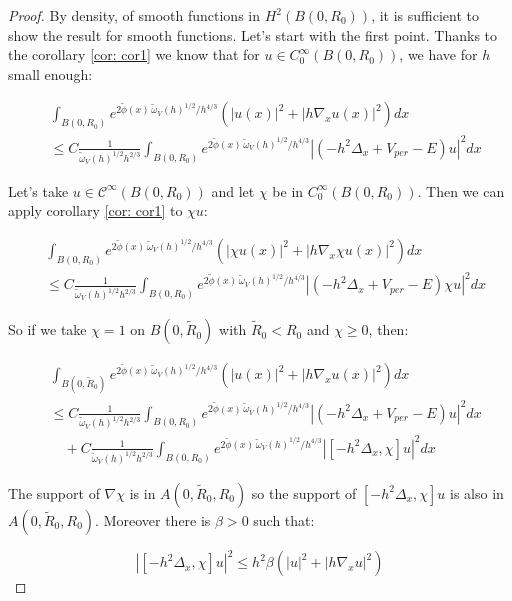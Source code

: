 \documentclass[10pt,a4paper]{amsart}
\newcommand{\nn}{\nonumber}
\begin{document}
\begin{proof}
	By density, of smooth functions in $H^2(B(0,R_0))$, it is sufficient to show the result for smooth functions. 
Let's start with the first point. Thanks to the corollary \ref{cor: cor1} we know that for $u \in C_0^\infty(B(0,R_0))$, we have for $h$ small enough:

\begin{align}
    &\int_{B(0,R_0)} e^{2\tilde{\phi}(x)\,\tilde{\omega}_V(h)^{1/2}/ h^{4/3}} (|u(x)|^2 +|h\nabla_x u(x)|^2)dx\nn\\
    &\leq C \frac{1}{\tilde{\omega}_V(h)^{1/2}h^{2/3}}\int_{B(0,R_0)} e^{2\tilde{\phi}(x)\,\tilde{\omega}_V(h)^{1/2}/ h^{4/3}}|(-h^2\Delta_x + V_{per}- E)u|^2dx
\end{align}

Let's take $u\in \mathcal{C}^\infty(B(0,R_0))$  and let $\chi$ be in $ C_0^\infty(B(0,R_0))$. Then we can apply corollary \ref{cor: cor1} to $\chi u$:

\begin{align}
    &\int_{B(0,R_0)} e^{2\tilde{\phi}(x)\,\tilde{\omega}_V(h)^{1/2}/ h^{4/3}} (|\chi u(x)|^2 +|h\nabla_x \chi u(x)|^2)dx\nn\\
    &\leq C \frac{1}{\tilde{\omega}_V(h)^{1/2}h^{2/3}}\int_{B(0,R_0)} e^{2\tilde{\phi}(x)\,\tilde{\omega}_V(h)^{1/2}/ h^{4/3}}|(-h^2\Delta_x + V_{per}- E)\chi u|^2dx
\end{align}

So if we take $\chi=1$ on $B(0,\tilde{R}_0)$ with $\tilde{R}_0<R_0$ and $\chi\geq 0$, then:

\begin{align}
    &\int_{B(0,\tilde{R}_0)} e^{2\tilde{\phi}(x)\,\tilde{\omega}_V(h)^{1/2}/ h^{4/3}} ( |u(x)|^2 +|h\nabla_x u(x)|^2)dx\nn\\
    &\leq C \frac{1}{\tilde{\omega}_V(h)^{1/2}h^{2/3}}\int_{B(0,R_0)} e^{2\tilde{\phi}(x)\,\tilde{\omega}_V(h)^{1/2}/ h^{4/3}}|(-h^2\Delta_x + V_{per}- E) u|^2dx\nn\\
    &\quad + C \frac{1}{\tilde{\omega}_V(h)^{1/2}h^{2/3}}\int_{B(0,R_0)} e^{2\tilde{\phi}(x)\,\tilde{\omega}_V(h)^{1/2}/ h^{4/3}}|[-h^2\Delta_x ,\chi] u|^2dx
\end{align}

The support of $\nabla\chi$ is in $A(0,\tilde{R}_0,R_0)$ so the support of $[-h^2\Delta_x ,\chi] u$ is also in $A(0,\tilde{R}_0,R_0)$. Moreover there is $\beta>0$ such that:

\begin{equation}
|[-h^2\Delta_x ,\chi] u|^2 \leq  h^2 \beta(|u|^2 +|h\nabla_x u|^2)
\end{equation} 


\end{proof}
\end{document}
